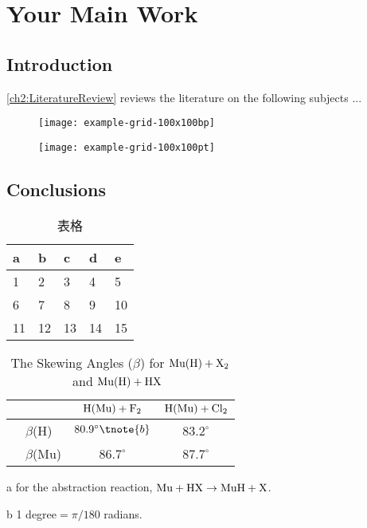 \chapter{Your Main Work}

\section{Introduction}
\label{ch3:sec:Introduction}
\cref{ch2:LiteratureReview} reviews the literature on the following subjects ...

\begin{figure}[ht]
\centering
\begin{minipage}[t]{0.48\linewidth}
  \centering
  \texttt{[image: example-grid-100x100bp]}
  \label{fig:fig4}
\end{minipage}
\hfill
\begin{minipage}[t]{0.48\linewidth}
  \centering
  \texttt{[image: example-grid-100x100pt]}
  \label{fig:fig5}
\end{minipage}
\end{figure}

\section{Conclusions}
\label{ch3:sec:Conclusions}

\begin{table}[H]
\centering{}
\caption{表格}
\label{tab:my-table}
\begin{tabular}{@{}lllll@{}}
\toprule
a  & b  & c  & d  & e  \\ 
\midrule
1  & 2  & 3  & 4  & 5  \\
6  & 7  & 8  & 9  & 10 \\
11 & 12 & 13 & 14 & 15 \\ 
\bottomrule
\end{tabular}
\end{table}

\begin{table}[H]
\centering{}
\begin{threeparttable}
\caption{The Skewing Angles ($\beta$) for $\fam0 Mu(H)+X_2$ and
   $\fam0 Mu(H)+HX$~}
\begin{tabular}{rlcc}
\toprule
&   & $\fam0 H(Mu)+F_2$ & $\fam0 H(Mu)+Cl_2$ \\
\midrule
&$\beta$(H)  & $80.9^\circ\tnote{b}$ & $83.2^\circ$ \\
&$\beta$(Mu) & $86.7^\circ$ & $87.7^\circ$ \\
\bottomrule
\end{tabular}
\begin{tablenotes}
\item[a] for the abstraction reaction, $\fam0 Mu+HX \rightarrow MuH+X$.
\item[b] 1 degree${} = \pi/180$ radians.
\end{tablenotes}
\end{threeparttable}
\end{table}

